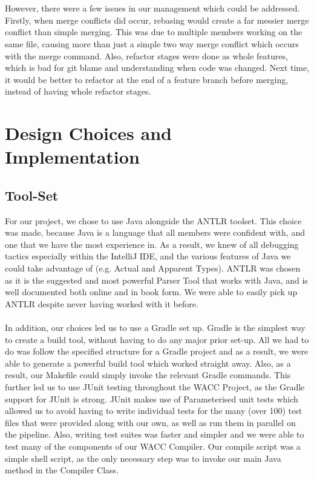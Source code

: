 \documentclass[5pt]{article}
\begin{document}
\\ \\
However, there were a few issues in our management which could be addressed. Firstly, when merge conflicts did occur, rebasing would create a far messier merge conflict than simple merging. This was due to multiple members working on the same file, causing more than just a simple two way merge conflict which occurs with the merge command. Also, refactor stages were done as whole features, which is bad for git blame and understanding when code was changed. Next time, it would be better to refactor at the end of a feature branch before merging, instead of having whole refactor stages.

\section{Design Choices and Implementation}
\subsection{Tool-Set}
For our project, we chose to use Java alongside the ANTLR toolset. This choice was made, because Java is a language that all members were confident with, and one that we have the most experience in. As a result, we knew of all debugging tactics especially within the IntelliJ IDE, and the various features of Java we could take advantage of (e.g. Actual and Apparent Types). ANTLR was chosen as it is the suggested and most powerful Parser Tool that works with Java, and is well documented both online and in book form. We were able to easily pick up ANTLR despite never having worked with it before.
\\ \\
In addition, our choices led us to use a Gradle set up. Gradle is the simplest way to create a build tool, without having to do any major prior set-up. All we had to do was follow the specified structure for a Gradle project and as a result, we were able to generate a powerful build tool which worked straight away. Also, as a result, our Makefile could simply invoke the relevant Gradle commands. This further led us to use JUnit testing throughout the WACC Project, as the Gradle support for JUnit is strong. JUnit makes use of Parameterised unit tests which allowed us to avoid having to write individual tests for the many (over 100) test files that were provided along with our own, as well as run them in parallel on the pipeline. Also, writing test suites was faster and simpler and we were able to test many of the components of our WACC Compiler. Our compile script was a simple shell script, as the only necessary step was to invoke our main Java method in the Compiler Class.
\end{document}
